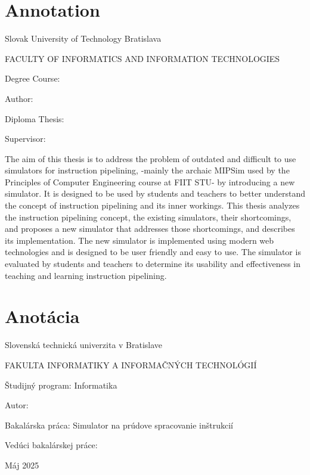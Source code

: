\thispagestyle{empty}

\section*{Annotation}

\begin{minipage}[t]{1\columnwidth}%
Slovak University of Technology Bratislava 

FACULTY OF INFORMATICS AND INFORMATION TECHNOLOGIES

Degree Course: \myStudyProgram
\newline

Author: \myName

Diploma Thesis: \myTitle

Supervisor: \mySupervisor

\myDate%
\end{minipage}

\bigskip{}

The aim of this thesis is to address the problem of outdated and difficult to use simulators for instruction pipelining, -mainly the archaic MIPSim used by the Principles of Computer Engineering course at FIIT STU- by introducing a new simulator. It is designed to be used by students and teachers to better understand the concept of instruction pipelining and its inner workings. This thesis analyzes the instruction pipelining concept, the existing simulators, their shortcomings, and proposes a new simulator that addresses those shortcomings, and describes its implementation. The new simulator is implemented using modern web technologies and is designed to be user friendly and easy to use. The simulator is evaluated by students and teachers to determine its usability and effectiveness in teaching and learning instruction pipelining.


\newpage{}\thispagestyle{empty}

\newpage
\thispagestyle{empty}
\mbox{}
\newpage

\thispagestyle{empty}
\section*{Anotácia}

\begin{minipage}[t]{1\columnwidth}%
Slovenská technická univerzita v Bratislave

FAKULTA INFORMATIKY A INFORMAČNÝCH TECHNOLÓGIÍ

Študijný program: Informatika
\newline

Autor: \myName

Bakalárska práca: Simulator na prúdove spracovanie inštrukcií

Vedúci bakalárskej práce: \mySupervisor

Máj 2025
\end{minipage}


